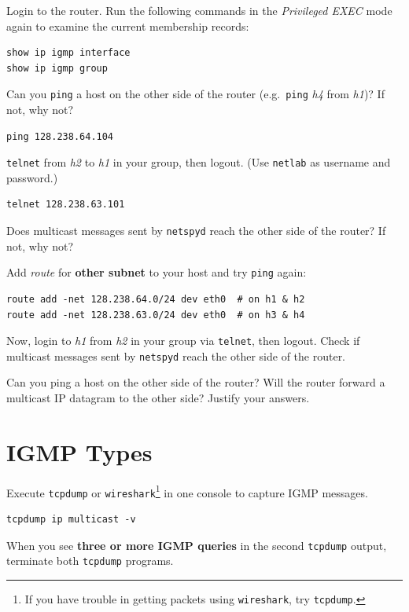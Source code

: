 \documentclass{../UTNetLab}
\begin{document}
    Login to the router.
    Run the following commands in the \textit{Privileged EXEC} mode again to examine the current membership records:
    \begin{lstlisting}[language=cisco]
show ip igmp interface
show ip igmp group
    \end{lstlisting}

    Can you \lstinline{ping} a host on the other side of the router (e.g.\ \lstinline{ping} \textit{h4} from \textit{h1})? If not, why not?
    \begin{lstlisting}
ping 128.238.64.104
    \end{lstlisting}

    \lstinline{telnet} from \textit{h2} to \textit{h1} in your group, then logout. (Use \texttt{netlab} as username and password.)
    \begin{lstlisting}
telnet 128.238.63.101
    \end{lstlisting}
    Does multicast messages sent by \lstinline{netspyd} reach the other side of the router? If not, why not?

    Add \textit{route} for \textbf{other subnet} to your host and try \lstinline{ping} again:
    \begin{lstlisting}[emph={eth0}]
route add -net 128.238.64.0/24 dev eth0  # on h1 & h2
route add -net 128.238.63.0/24 dev eth0  # on h3 & h4
    \end{lstlisting}
    Now, login to \textit{h1} from \textit{h2} in your group via \lstinline{telnet}, then logout.
    Check if multicast messages sent by \lstinline{netspyd} reach the other side of the router.
    
    \begin{report}
    \item Can you ping a host on the other side of the router?
    Will the router forward a multicast IP datagram to the other side?
    Justify your answers.
    \end{report}

\section{IGMP Types}
    Execute \lstinline{tcpdump} or \lstinline{wireshark}\footnote{If you have trouble in getting packets using \lstinline{wireshark}, try \lstinline{tcpdump}.} in one console to capture IGMP messages.
    \begin{lstlisting}[emph={eth0}]
tcpdump ip multicast -v
    \end{lstlisting}
    When you see \textbf{three or more IGMP queries} in the second \lstinline{tcpdump} output, terminate both \lstinline{tcpdump} programs.
\end{document}
